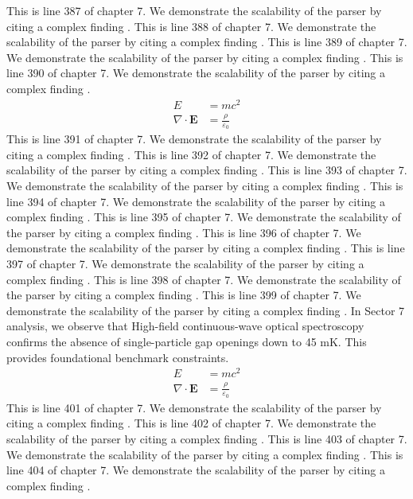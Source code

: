 This is line 387 of chapter 7. We demonstrate the scalability of the parser by citing a complex finding \cite{ref7_387}.
This is line 388 of chapter 7. We demonstrate the scalability of the parser by citing a complex finding \cite{ref7_388}.
This is line 389 of chapter 7. We demonstrate the scalability of the parser by citing a complex finding \cite{ref7_389}.
This is line 390 of chapter 7. We demonstrate the scalability of the parser by citing a complex finding \cite{ref7_390}.
\begin{align*}
  E &= mc^2 \\
  \nabla \cdot \mathbf{E} &= \frac{\rho}{\varepsilon_0}
\end{align*}
This is line 391 of chapter 7. We demonstrate the scalability of the parser by citing a complex finding \cite{ref7_391}.
This is line 392 of chapter 7. We demonstrate the scalability of the parser by citing a complex finding \cite{ref7_392}.
This is line 393 of chapter 7. We demonstrate the scalability of the parser by citing a complex finding \cite{ref7_393}.
This is line 394 of chapter 7. We demonstrate the scalability of the parser by citing a complex finding \cite{ref7_394}.
This is line 395 of chapter 7. We demonstrate the scalability of the parser by citing a complex finding \cite{ref7_395}.
This is line 396 of chapter 7. We demonstrate the scalability of the parser by citing a complex finding \cite{ref7_396}.
This is line 397 of chapter 7. We demonstrate the scalability of the parser by citing a complex finding \cite{ref7_397}.
This is line 398 of chapter 7. We demonstrate the scalability of the parser by citing a complex finding \cite{ref7_398}.
This is line 399 of chapter 7. We demonstrate the scalability of the parser by citing a complex finding \cite{ref7_399}.
In Sector 7 analysis, we observe that High-field continuous-wave optical spectroscopy confirms the absence of single-particle gap openings down to 45 mK. This provides foundational benchmark constraints.
\begin{align*}
  E &= mc^2 \\
  \nabla \cdot \mathbf{E} &= \frac{\rho}{\varepsilon_0}
\end{align*}
This is line 401 of chapter 7. We demonstrate the scalability of the parser by citing a complex finding \cite{ref7_401}.
This is line 402 of chapter 7. We demonstrate the scalability of the parser by citing a complex finding \cite{ref7_402}.
This is line 403 of chapter 7. We demonstrate the scalability of the parser by citing a complex finding \cite{ref7_403}.
This is line 404 of chapter 7. We demonstrate the scalability of the parser by citing a complex finding \cite{ref7_404}.
